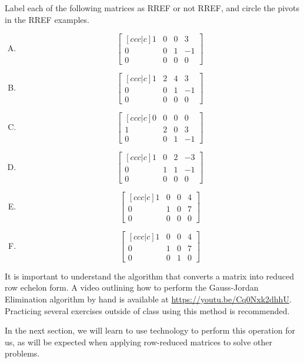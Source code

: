 \begin{applicationActivities}
\begin{activity}{10}
Label each of the following matrices as RREF or not RREF, and circle the
pivots in the RREF examples.
\begin{multicols}{3}
\begin{enumerate}[(A)]
\item \[ \begin{bmatrix}[ccc|c] 1 & 0 & 0 & 3 \\ 0 & 0 & 1 & -1 \\ 0 & 0 & 0 & 0 \end{bmatrix}\]
\item \[ \begin{bmatrix}[ccc|c] 1 & 2 & 4 & 3 \\ 0 & 0 & 1 & -1 \\ 0 & 0 & 0 & 0 \end{bmatrix}\]
\item \[ \begin{bmatrix}[ccc|c] 0 & 0 & 0 & 0 \\ 1 & 2 & 0 & 3 \\ 0 & 0 & 1 & -1  \end{bmatrix}\]
\item \[ \begin{bmatrix}[ccc|c] 1 & 0 & 2 & -3 \\ 0 & 1 & 1 & -1 \\ 0 & 0 & 0 & 0 \end{bmatrix}\]
\item \[ \begin{bmatrix}[ccc|c] 1 & 0 & 0 & 4 \\ 0 & 1 & 0 & 7 \\ 0 & 0 & 0 & 0 \end{bmatrix}\]
\item \[ \begin{bmatrix}[ccc|c] 1 & 0 & 0 & 4 \\ 0 & 1 & 0 & 7 \\ 0 & 0 & 1 & 0 \end{bmatrix}\]
\end{enumerate}
\end{multicols}
\end{activity}

\begin{remark}
It is important to understand the  algorithm
that converts a matrix into reduced row echelon form.
A video outlining how to perform the Gauss-Jordan Elimination algorithm
by hand is available at \url{https://youtu.be/Cq0Nxk2dhhU}.
Practicing several exercises outside of class using this method is
recommended.

In the next section, we will learn to use technology to perform this
operation for us, as will be expected when applying row-reduced
matrices to solve other problems.
\end{remark}




\end{applicationActivities}
